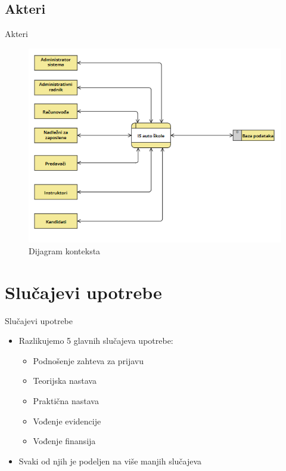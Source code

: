 \documentclass[compress, containsverbatim,mathserif, xcolor=dvipsnames, unicode]{beamer}
\begin{document}
\subsection{Akteri}
\begin{frame}{Akteri}
        \begin{figure}[h!]
        \begin{center}
          \includegraphics[scale = 0.5]{dijagram_konteksta.png}
        \end{center}
       \caption{Dijagram konteksta}
    \end{figure}   
\end{frame}

\section{Slučajevi upotrebe}
\begin{frame}{Slučajevi upotrebe}
\vspace{\baselineskip}
\begin{itemize}
	\item Razlikujemo 5 glavnih slučajeva upotrebe:
    \begin{itemize}
        \item Podnošenje zahteva za prijavu
        \item Teorijska nastava
        \item Praktična nastava
        \item Vođenje evidencije
        \item Vođenje finansija
    \end{itemize}
    \item Svaki od njih je podeljen na više manjih slučajeva
    
\end{itemize}
\end{frame}
\end{document}
